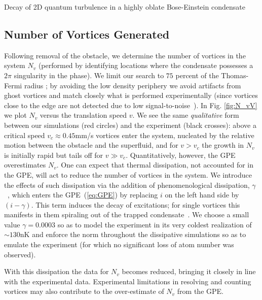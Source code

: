 \begin{chapter}{\label{cha:shin}Decay of 2D quantum turbulence in a highly oblate Bose-Einstein condensate}
\subsection{Number of Vortices Generated}
Following removal of the obstacle, we determine the number of vortices in the system $N_v$ (performed by identifying locations where the condensate possesses a $2\pi$ singularity in the phase).  
We limit our search to $75$ percent
 of the Thomas-Fermi radius ; by avoiding the low density periphery we avoid artifacts from ghost vortices and match closely what is performed experimentally (since vortices close to the edge are not detected due to low signal-to-noise~\citep{shin_private}).  In Fig. \ref{fig:N_vV} we plot $N_v$ versus the translation speed $v$.  We see the same {\it qualitative} form between our simulations (red circles) and the experiment (black crosses): above a critical speed $v_c \approx 0.45$mm/s vortices enter the system, nucleated by the relative motion between the obstacle and the superfluid, and for $v>v_c$ the growth in $N_v$ is initially rapid but tails off for $v\gg v_c$. Quantitatively, however, the GPE overestimates $N_v$.   One can expect that thermal dissipation, not accounted for in the GPE, will act to reduce the number of vortices in the system.  We introduce the effects of such dissipation via the addition of phenomenological dissipation, $\gamma$~\citep{choi_morgan_98,tsubota_kasamatsu_02}, which enters the GPE~(\ref{eq:GPE}) by replacing $i$ on the left hand side by $(i-\gamma)$.  This term induces the decay of excitations; for single vortices this manifests in them spiraling out of the trapped condensate~\citep{madarassy_barenghi_08,jackson_proukakis_09,allen_zaremba_13,yan_proukakis_14}.  
We choose a small value $\gamma = 0.0003$ so as to model the experiment in its very coldest realization of $\sim130$nK and enforce the norm throughout the dissipative simulations so as to emulate the experiment (for which no significant loss of atom number was observed).

 With this dissipation the data for $N_v$ becomes reduced, bringing it closely in line with the experimental data. Experimental limitations in resolving and counting vortices may also contribute to the over-estimate of $N_v$ from the GPE.



\end{chapter}
